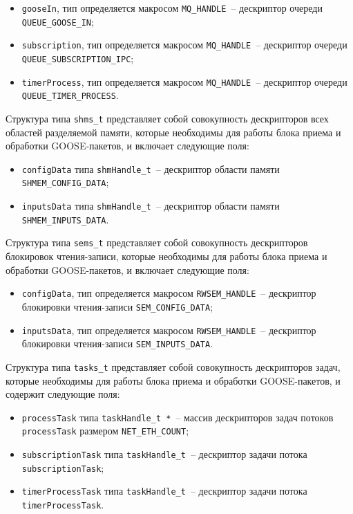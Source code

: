 \begin{itemize}
    \item \lstinline{gooseIn}, тип определяется макросом \lstinline{MQ_HANDLE}~-- дескриптор очереди \lstinline{QUEUE_GOOSE_IN};
    \item \lstinline{subscription}, тип определяется макросом \lstinline{MQ_HANDLE}~-- дескриптор очереди \lstinline{QUEUE_SUBSCRIPTION_IPC};
    \item \lstinline{timerProcess}, тип определяется макросом \lstinline{MQ_HANDLE}~-- дескриптор очереди \lstinline{QUEUE_TIMER_PROCESS}.
\end{itemize}

Структура типа \lstinline{shms_t} представляет собой совокупность дескрипторов всех областей разделяемой памяти, которые необходимы для работы блока приема и обработки GOOSE-пакетов, и включает следующие поля:

\begin{itemize}
    \item \lstinline{configData} типа \lstinline{shmHandle_t}~-- дескриптор области памяти \lstinline{SHMEM_CONFIG_DATA};
    \item \lstinline{inputsData} типа \lstinline{shmHandle_t}~-- дескриптор области памяти \lstinline{SHMEM_INPUTS_DATA}.
\end{itemize}

Структура типа \lstinline{sems_t} представляет собой совокупность дескрипторов блокировок чтения-записи, которые необходимы для работы блока приема и обработки GOOSE-пакетов, и включает следующие поля:

\begin{itemize}
    \item \lstinline{configData}, тип определяется макросом \lstinline{RWSEM_HANDLE}~-- дескриптор блокировки чтения-записи \lstinline{SEM_CONFIG_DATA};
    \item \lstinline{inputsData}, тип определяется макросом \lstinline{RWSEM_HANDLE}~-- дескриптор блокировки чтения-записи \lstinline{SEM_INPUTS_DATA}.
\end{itemize}

Структура типа \lstinline{tasks_t} представляет собой совокупность дескрипторов задач, которые необходимы для работы блока приема и обработки GOOSE-пакетов, и содержит следующие поля:

\begin{itemize}
    \item \lstinline{processTask} типа \lstinline{taskHandle_t *}~-- массив дескрипторов задач потоков \lstinline{processTask} размером \lstinline{NET_ETH_COUNT};
    \item \lstinline{subscriptionTask} типа \lstinline{taskHandle_t}~-- дескриптор задачи потока \lstinline{subscriptionTask};
    \item \lstinline{timerProcessTask} типа \lstinline{taskHandle_t}~-- дескриптор задачи потока \lstinline{timerProcessTask}.
\end{itemize}

